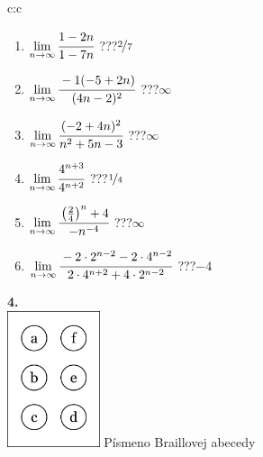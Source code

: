 \documentclass[10pt]{report}
\begin{document}
\begin{tabular}{c:c}
\begin{minipage}[c][104.5mm][t]{0.5\linewidth}
\begin{center}
\begin{minipage}{0.79\linewidth}
\begin{center}
\begin{varwidth}{\linewidth}
\begin{enumerate}
\normalsize
\item $\lim\limits_{n\to\infty}\cfrac{1-2n}{1-7n}$\quad \dotfill\; ???\;\dotfill \quad $\nicefrac{2}{7}$
\item $\lim\limits_{n\to\infty}\cfrac{-1(-5+2n)}{(4n-2)^2}$\quad \dotfill\; ???\;\dotfill \quad $\infty$
\item $\lim\limits_{n\to\infty}\cfrac{(-2+4n)^2}{n^2+5n-3}$\quad \dotfill\; ???\;\dotfill \quad $\infty$
\item $\lim\limits_{n\to\infty}\cfrac{4^{n+3}}{4^{n+2}}$\quad \dotfill\; ???\;\dotfill \quad $\nicefrac{1}{4}$
\item $\lim\limits_{n\to\infty}\cfrac{\left(\frac{2}{4}\right)^n +4}{-n^{-4}}$\quad \dotfill\; ???\;\dotfill \quad $\infty$
\item $\lim\limits_{n\to\infty}\cfrac{-2\cdot 2^{n-2}-2\cdot 4^{n-2}}{2\cdot 4^{n+2}+4\cdot 2^{n-2}}$\quad \dotfill\; ???\;\dotfill \quad $-4$
\end{enumerate}
\end{varwidth}
\end{center}
\end{minipage}
\begin{minipage}{0.20\linewidth}
\begin{center}
{\Huge\bfseries 4.} \\[2mm]
\includegraphics[height=40mm]{../images/braille.png}
{\small Písmeno Braillovej abecedy}
\end{center}
\end{minipage}
\end{center}
\end{minipage}
%
\end{tabular}
\newpage
\thispagestyle{empty}
\end{document}
